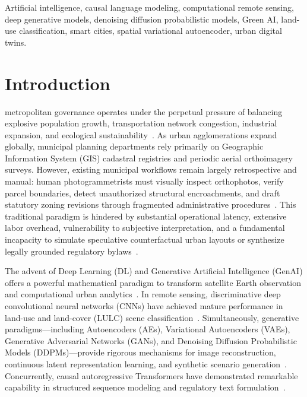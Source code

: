 \documentclass[journal]{IEEEtran}
\begin{document}
\begin{IEEEkeywords}
Artificial intelligence, causal language modeling, computational remote sensing, deep generative models, denoising diffusion probabilistic models, Green AI, land-use classification, smart cities, spatial variational autoencoder, urban digital twins.
\end{IEEEkeywords}

\section{Introduction}
 metropolitan governance operates under the perpetual pressure of balancing explosive population growth, transportation network congestion, industrial expansion, and ecological sustainability~\cite{weng2002remote,batty2013new,benediktsson2015remote}. As urban agglomerations expand globally, municipal planning departments rely primarily on Geographic Information System (GIS) cadastral registries and periodic aerial orthoimagery surveys. However, existing municipal workflows remain largely retrospective and manual: human photogrammetrists must visually inspect orthophotos, verify parcel boundaries, detect unauthorized structural encroachments, and draft statutory zoning revisions through fragmented administrative procedures~\cite{chen2023remote}. This traditional paradigm is hindered by substantial operational latency, extensive labor overhead, vulnerability to subjective interpretation, and a fundamental incapacity to simulate speculative counterfactual urban layouts or synthesize legally grounded regulatory bylaws~\cite{chen2023generative}.

The advent of Deep Learning (DL) and Generative Artificial Intelligence (GenAI) offers a powerful mathematical paradigm to transform satellite Earth observation and computational urban analytics~\cite{lecun2015deep,zhu2017deep}. In remote sensing, discriminative deep convolutional neural networks (CNNs) have achieved mature performance in land-use and land-cover (LULC) scene classification~\cite{cheng2017remote,yang2010bag,he2016deep}. Simultaneously, generative paradigms---including Autoencoders (AEs), Variational Autoencoders (VAEs), Generative Adversarial Networks (GANs), and Denoising Diffusion Probabilistic Models (DDPMs)---provide rigorous mechanisms for image reconstruction, continuous latent representation learning, and synthetic scenario generation~\cite{vincent2008extracting,kingma2013auto,goodfellow2014generative,ho2020denoising}. Concurrently, causal autoregressive Transformers have demonstrated remarkable capability in structured sequence modeling and regulatory text formulation~\cite{vaswani2017attention,radford2019language}.
\end{document}
